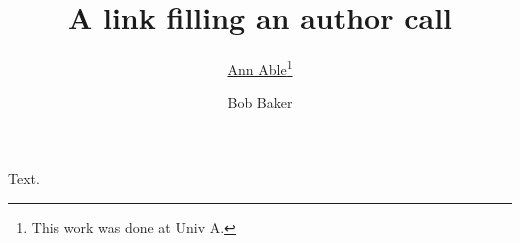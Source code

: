 \documentclass{article}
\title{A link filling an author call}
\author[1,2]{\href{ann.able@a.org}{Ann Able}\thanks{This work was done at Univ A.}}
\author[2]{Bob Baker}
\affil[1]{Univ A, Town}
\affil[2]{Univ B, City}
\begin{document}
\maketitle
Text.
\end{document}
